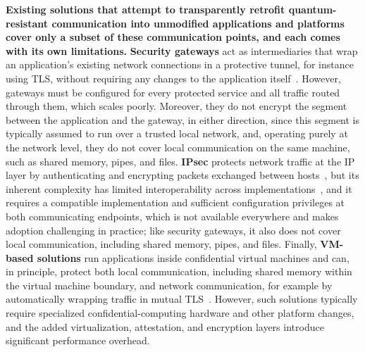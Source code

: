 \documentclass[a4paper,10pt,fleqn]{application}
\begin{document}
\textbf{Existing solutions that attempt to transparently retrofit quantum-resistant communication into unmodified applications and platforms cover only a subset of these communication points, and each comes with its own limitations.} \textbf{Security gateways} act as intermediaries that wrap an application's existing network connections in a protective tunnel, for instance using TLS, without requiring any changes to the application itself~\cite{Durumeric2017HTTPSInterception,Stunnel2026Manual}. However, gateways must be configured for every protected service and all traffic routed through them, which scales poorly. Moreover, they do not encrypt the segment between the application and the gateway, in either direction, since this segment is typically assumed to run over a trusted local network, and, operating purely at the network level, they do not cover local communication on the same machine, such as shared memory, pipes, and files. \textbf{IPsec} protects network traffic at the IP layer by authenticating and encrypting packets exchanged between hosts~\cite{Kent2005RFC4301}, but its inherent complexity has limited interoperability across implementations~\cite{Pepelnjak2013IPsecComplexity}, and it requires a compatible implementation and sufficient configuration privileges at both communicating endpoints, which is not available everywhere and makes adoption challenging in practice; like security gateways, it also does not cover local communication, including shared memory, pipes, and files. Finally, \textbf{VM-based solutions} run applications inside confidential virtual machines and can, in principle, protect both local communication, including shared memory within the virtual machine boundary, and network communication, for example by automatically wrapping traffic in mutual TLS~\cite{Misono2024ConfidentialVMs,EdgelessContrast2026}. However, such solutions typically require specialized confidential-computing hardware and other platform changes, and the added virtualization, attestation, and encryption layers introduce significant performance overhead.
\end{document}
